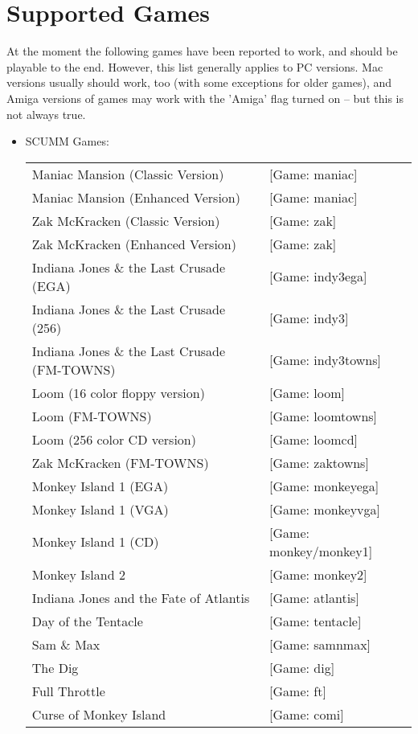 


\section{Supported Games}

At the moment the following games have been reported to work, and should
be playable to the end. However, this list generally applies to PC versions.
Mac versions usually should work, too (with some exceptions for older games),
and Amiga versions of games may work with the 'Amiga' flag turned on -- but
this is not always true.

\begin{itemize}
\item SCUMM Games:\\
  \begin {tabular} [h] {ll}
    Maniac Mansion (Classic Version)&              [Game: maniac]\\
    Maniac Mansion (Enhanced Version)&             [Game: maniac]\\
    Zak McKracken (Classic Version)&               [Game: zak]\\
    Zak McKracken (Enhanced Version)&              [Game: zak]\\
    Indiana Jones \& the Last Crusade (EGA)&       [Game: indy3ega]\\
    Indiana Jones \& the Last Crusade (256)&       [Game: indy3]\\
    Indiana Jones \& the Last Crusade (FM-TOWNS)&  [Game: indy3towns]\\
    Loom (16 color floppy version)&                [Game: loom]\\
    Loom (FM-TOWNS)&                               [Game: loomtowns]\\
    Loom (256 color CD version)&                   [Game: loomcd]\\
    Zak McKracken (FM-TOWNS)&                      [Game: zaktowns]\\
    Monkey Island 1 (EGA)&                         [Game: monkeyega]\\
    Monkey Island 1 (VGA)&                         [Game: monkeyvga]\\
    Monkey Island 1 (CD)&                          [Game: monkey/monkey1]\\
    Monkey Island 2&                               [Game: monkey2]\\
    Indiana Jones and the Fate of Atlantis&        [Game: atlantis]\\
    Day of the Tentacle&                           [Game: tentacle]\\
    Sam \& Max&                                    [Game: samnmax]\\
    The Dig&                                       [Game: dig]\\
    Full Throttle&                                 [Game: ft]\\
    Curse of Monkey Island&                        [Game: comi]\\


\end{tabular}
\end{itemize}
